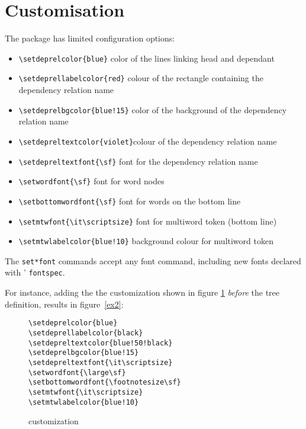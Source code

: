 \documentclass[12pt]{article}
\begin{document}
\section{Customisation}
The package has limited configuration options:
\begin{itemize}
\item \verb:\setdeprelcolor{blue}: color of the lines linking head and
  dependant
\item \verb:\setdeprellabelcolor{red}: colour of the rectangle
  containing the dependency relation name
\item \verb:\setdeprelbgcolor{blue!15}: color of the background of the
  dependency relation name
  
\item \verb:\setdepreltextcolor{violet}:colour of the dependency relation name
\item \verb:\setdepreltextfont{\sf}: font for the dependency relation  name
\item \verb:\setwordfont{\sf}: font for word nodes
\item \verb:\setbottomwordfont{\sf}: font for words on the bottom line
\item \verb:\setmtwfont{\it\scriptsize}: font for multiword token (bottom line)
\item \verb:\setmtwlabelcolor{blue!10}: background colour for multiword token
\end{itemize}

The \verb:set*font: commands accept any font command, including new
fonts declared with \XeLaTeX' \verb:fontspec:.

For instance, adding the the customization shown in figure \ref{def2}
\emph{before} 
the tree definition, results in figure~\ref{ex2}:

\begin{figure}[H]
\begin{verbatim}
\setdeprelcolor{blue}
\setdeprellabelcolor{black}
\setdepreltextcolor{blue!50!black}
\setdeprelbgcolor{blue!15}    
\setdepreltextfont{\it\scriptsize}
\setwordfont{\large\sf}
\setbottomwordfont{\footnotesize\sf}
\setmtwfont{\it\scriptsize}
\setmtwlabelcolor{blue!10}
\end{verbatim}
\caption{customization}\label{def2}
\end{figure}



\setdepreltextfont{\it\scriptsize}
\setwordfont{\large\sf}
\setbottomwordfont{\footnotesize\sf}
\setmtwfont{\it\scriptsize}
\end{document}
